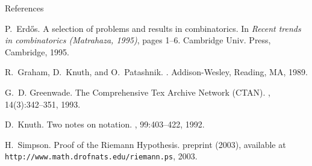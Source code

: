 \documentclass[aspectratio=169]{beamer}
\begin{document}

	\begin{frame}[allowframebreaks]{References}
      \begin{thebibliography}{1}

         P.~Erd{\H o}s.
         \newblock A selection of problems and results in combinatorics.
         \newblock In {\em Recent trends in combinatorics (Matrahaza, 1995)}, pages 1--6. Cambridge Univ. Press, Cambridge, 1995.
         
         R.~Graham, D.~Knuth, and O.~Patashnik.
         .
         \newblock Addison-Wesley, Reading, MA, 1989.
         
         G.~D. Greenwade.
         \newblock The {C}omprehensive {T}ex {A}rchive {N}etwork ({CTAN}).
         , 14(3):342--351, 1993.
         
         D.~Knuth.
         \newblock Two notes on notation.
         , 99:403--422, 1992.
         
         H.~Simpson.
         \newblock Proof of the {R}iemann {H}ypothesis.
         \newblock preprint (2003), available at \texttt{http://www.math.drofnats.edu/riemann.ps}, 2003.
         
      \end{thebibliography}
   \end{frame}
	
\end{document}
